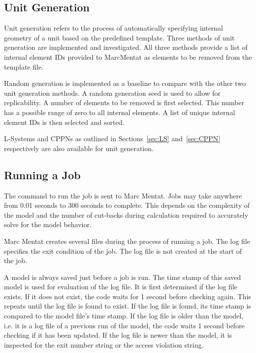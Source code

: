 \subsection{Unit Generation}
\label{ssec:ug}

Unit generation refers to the process of automatically specifying internal geometry of a unit based on the predefined template. Three methods of unit generation are implemented and investigated. All three methods provide a list of internal element IDs provided to MarcMentat as elements to be removed from the template file.

Random generation is implemented as a baseline to compare with the other two unit generation methods. A random generation seed is used to allow for replicability. A number of elements to be removed is first selected. This number has a possible range of zero to all internal elements. A list of unique internal element IDs is then selected and sorted.

L-Systems and CPPNs as outlined in Sections~\ref{sec:LS} and~\ref{sec:CPPN} respectively are also available for unit generation.

\subsection{Running a Job}
\label{ssec:run}

The command to run the job is sent to Marc Mentat. Jobs may take anywhere from 0.01 seconds to 300 seconds to complete. This depends on the complexity of the model and the number of cut-backs during calculation required to accurately solve for the model behavior.

Marc Mentat creates several files during the process of running a job. The log file specifies the exit condition of the job. The log file is not created at the start of the job.

A model is always saved just before a job is run. The time stamp of this saved model is used for evaluation of the log file. It is first determined if the log file exists. If it does not exist, the code waits for 1 second before checking again. This repeats until the log file is found to exist. If the log file is found, its time stamp is compared to the model file's time stamp. If the log file is older than the model, i.e. it is a log file of a previous run of the model, the code waits 1 second before checking if it has been updated. If the log file is newer than the model, it is inspected for the exit number string or the access violation string.

